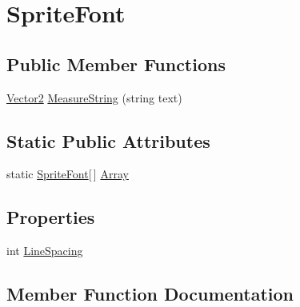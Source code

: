 \hypertarget{classMicrosoft_1_1Xna_1_1Framework_1_1Graphics_1_1SpriteFont}{}\section{Sprite\+Font}
\label{classMicrosoft_1_1Xna_1_1Framework_1_1Graphics_1_1SpriteFont}
\subsection*{Public Member Functions}
\begin{DoxyCompactItemize}
\item 
\hyperlink{structMicrosoft_1_1Xna_1_1Framework_1_1Vector2}{Vector2} \hyperlink{classMicrosoft_1_1Xna_1_1Framework_1_1Graphics_1_1SpriteFont_a187b591e3667bfbace7dffa1df2d1653}{Measure\+String} (string text)
\end{DoxyCompactItemize}
\subsection*{Static Public Attributes}
\begin{DoxyCompactItemize}
\item 
static \hyperlink{classMicrosoft_1_1Xna_1_1Framework_1_1Graphics_1_1SpriteFont}{Sprite\+Font}\mbox{[}$\,$\mbox{]} \hyperlink{classMicrosoft_1_1Xna_1_1Framework_1_1Graphics_1_1SpriteFont_a77e7f5a268a70755180ff9dbcd865ae3}{Array}
\end{DoxyCompactItemize}
\subsection*{Properties}
\begin{DoxyCompactItemize}
\item 
int \hyperlink{classMicrosoft_1_1Xna_1_1Framework_1_1Graphics_1_1SpriteFont_ac0a362948d8dd0e681e315f68b129dd8}{Line\+Spacing}
\end{DoxyCompactItemize}


\subsection{Member Function Documentation}
\hypertarget{classMicrosoft_1_1Xna_1_1Framework_1_1Graphics_1_1SpriteFont_a187b591e3667bfbace7dffa1df2d1653}{}
